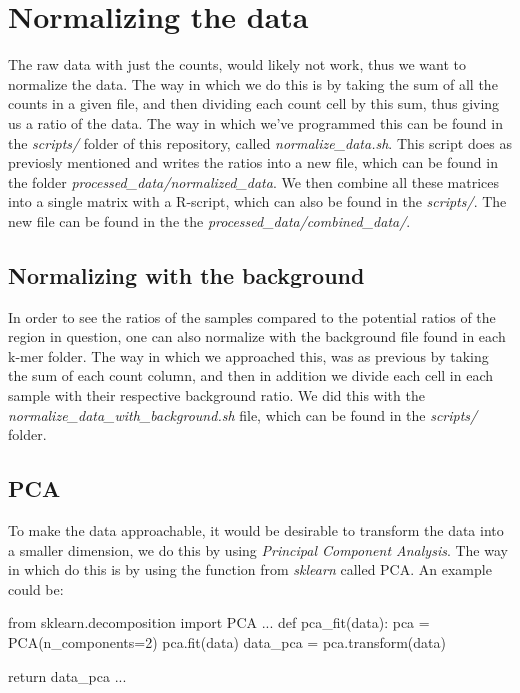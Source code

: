 \chapter{Normalizing the data}
The raw data with just the counts, would likely not work, thus we want to normalize the data. The way in which we do this is by taking the sum of all the counts in a given file, and then dividing each count cell by this sum, thus giving us a ratio of the data. The way in which we've programmed this can be found in the \textit{scripts/} folder of this repository, called \textit{normalize\_data.sh}. This script does as previosly mentioned and writes the ratios into a new file, which can be found in the folder \textit{processed\_data/normalized\_data}. We then combine all these matrices into a single matrix with a R-script, which can also be found in the \textit{scripts/}. The new file can be found in the the \textit{processed\_data/combined\_data/}.

\section{Normalizing with the background}
In order to see the ratios of the samples compared to the potential ratios of the region in question, one can also normalize with the background file found in each k-mer folder. The way in which we approached this, was as previous by taking the sum of each count column, and then in addition we divide each cell in each sample with their respective background ratio. We did this with the \textit{normalize\_data\_with\_background.sh} file, which can be found in the \textit{scripts/} folder.

\section{PCA}
To make the data approachable, it would be desirable to transform the data into a smaller dimension, we do this by using \textit{Principal Component Analysis}. The way in which do this is by using the function from \textit{sklearn} called PCA. An example could be:
\begin{python}
from sklearn.decomposition import PCA
...
def pca_fit(data):
    pca = PCA(n_components=2)
    pca.fit(data)
    data_pca = pca.transform(data)

    return data_pca
...
\end{python}
